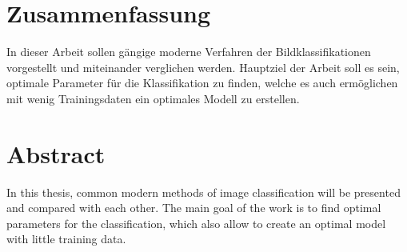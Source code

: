 \section*{Zusammenfassung}

In dieser Arbeit sollen gängige moderne Verfahren der Bildklassifikationen vorgestellt und miteinander verglichen werden. Hauptziel der Arbeit soll es sein, optimale Parameter für die Klassifikation zu finden, welche es auch ermöglichen mit wenig Trainingsdaten ein optimales Modell zu erstellen.

\section*{Abstract}

In this thesis, common modern methods of image classification will be presented and compared with each other. The main goal of the work is to find optimal parameters for the classification, which also allow to create an optimal model with little training data.
